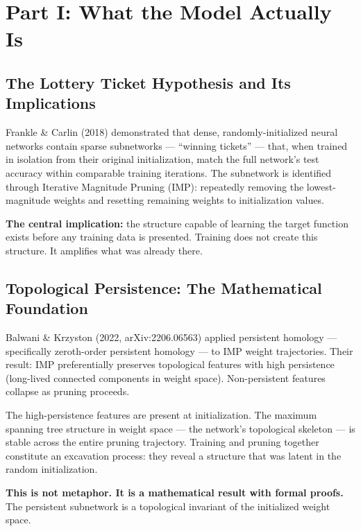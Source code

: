 \documentclass[12pt,letterpaper]{article}
\begin{document}
\clearpage
\tableofcontents
\clearpage

\doublespacing

\section{Part I: What the Model Actually Is}

\subsection{The Lottery Ticket Hypothesis and Its Implications}

Frankle \& Carlin (2018) demonstrated that dense, randomly-initialized neural networks contain sparse subnetworks — ``winning tickets'' — that, when trained in isolation from their original initialization, match the full network's test accuracy within comparable training iterations. The subnetwork is identified through Iterative Magnitude Pruning (IMP): repeatedly removing the lowest-magnitude weights and resetting remaining weights to initialization values.

\textbf{The central implication:} the structure capable of learning the target function exists before any training data is presented. Training does not create this structure. It amplifies what was already there.

\subsection{Topological Persistence: The Mathematical Foundation}

Balwani \& Krzyston (2022, arXiv:2206.06563) applied persistent homology — specifically zeroth-order persistent homology — to IMP weight trajectories. Their result: IMP preferentially preserves topological features with high persistence (long-lived connected components in weight space). Non-persistent features collapse as pruning proceeds.

The high-persistence features are present at initialization. The maximum spanning tree structure in weight space — the network's topological skeleton — is stable across the entire pruning trajectory. Training and pruning together constitute an excavation process: they reveal a structure that was latent in the random initialization.

\textbf{This is not metaphor. It is a mathematical result with formal proofs.} The persistent subnetwork is a topological invariant of the initialized weight space.
\end{document}
